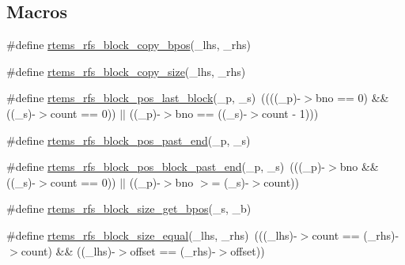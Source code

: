 \subsection*{Macros}
\begin{DoxyCompactItemize}
\item 
\#define \mbox{\hyperlink{rtems-rfs-block-pos_8h_a7b3e215af73a165107bb8b3f02d53fd4}{rtems\+\_\+rfs\+\_\+block\+\_\+copy\+\_\+bpos}}(\+\_\+lhs,  \+\_\+rhs)
\item 
\#define \mbox{\hyperlink{rtems-rfs-block-pos_8h_a13c2c5d74abc53cafa6495e1a6ba0ba6}{rtems\+\_\+rfs\+\_\+block\+\_\+copy\+\_\+size}}(\+\_\+lhs,  \+\_\+rhs)
\item 
\#define \mbox{\hyperlink{rtems-rfs-block-pos_8h_af9de1169214c5fbc1d5cbb8265e4b759}{rtems\+\_\+rfs\+\_\+block\+\_\+pos\+\_\+last\+\_\+block}}(\+\_\+p,  \+\_\+s)~((((\+\_\+p)-\/$>$bno == 0) \&\& ((\+\_\+s)-\/$>$count == 0)) $\vert$$\vert$ ((\+\_\+p)-\/$>$bno == ((\+\_\+s)-\/$>$count -\/ 1)))
\item 
\#define \mbox{\hyperlink{rtems-rfs-block-pos_8h_a7c9df0abcb57dfe35e4e18ae63356077}{rtems\+\_\+rfs\+\_\+block\+\_\+pos\+\_\+past\+\_\+end}}(\+\_\+p,  \+\_\+s)
\item 
\#define \mbox{\hyperlink{rtems-rfs-block-pos_8h_a297f50d2960d64bc7700cd41b504a614}{rtems\+\_\+rfs\+\_\+block\+\_\+pos\+\_\+block\+\_\+past\+\_\+end}}(\+\_\+p,  \+\_\+s)~(((\+\_\+p)-\/$>$bno \&\& ((\+\_\+s)-\/$>$count == 0)) $\vert$$\vert$ ((\+\_\+p)-\/$>$bno $>$= (\+\_\+s)-\/$>$count))
\item 
\#define \mbox{\hyperlink{rtems-rfs-block-pos_8h_ab5274e0b45785fdf7e7d403afb25ad99}{rtems\+\_\+rfs\+\_\+block\+\_\+size\+\_\+get\+\_\+bpos}}(\+\_\+s,  \+\_\+b)
\item 
\#define \mbox{\hyperlink{rtems-rfs-block-pos_8h_a5cacb1cecd9f6b85442e48a43f7a98a6}{rtems\+\_\+rfs\+\_\+block\+\_\+size\+\_\+equal}}(\+\_\+lhs,  \+\_\+rhs)~(((\+\_\+lhs)-\/$>$count == (\+\_\+rhs)-\/$>$count) \&\& ((\+\_\+lhs)-\/$>$offset == (\+\_\+rhs)-\/$>$offset))
\end{DoxyCompactItemize}
